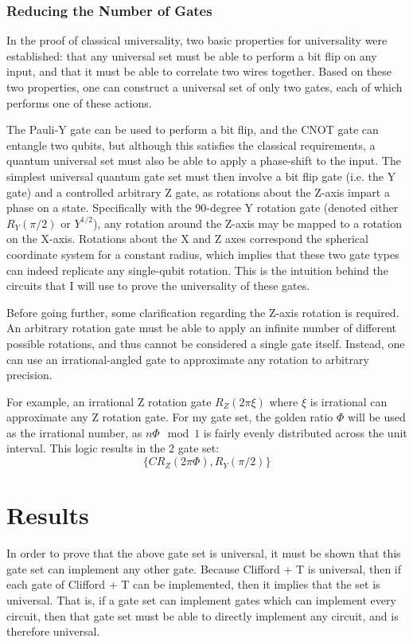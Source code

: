 \documentclass[12pt]{article}
\begin{document}
\subsubsection{Reducing the Number of Gates}
In the proof of classical universality, two basic properties for universality were established: that any universal set must be able to perform a bit flip on any input, and that it must be able to correlate two wires together. Based on these two properties, one can construct a universal set of only two gates, each of which performs one of these actions.

The Pauli-Y gate can be used to perform a bit flip, and the CNOT gate can entangle two qubits, but although this satisfies the classical requirements, a quantum universal set must also be able to apply a phase-shift to the input. The simplest universal quantum gate set must then involve a bit flip gate (i.e. the Y gate) and a controlled arbitrary Z gate, as rotations about the Z-axis impart a phase on a state. Specifically with the 90-degree Y rotation gate (denoted either $R_Y(\pi/2)$ or $Y^{1/2}$), any rotation around the Z-axis may be mapped to a rotation on the X-axis. Rotations about the X and Z axes correspond the spherical coordinate system for a constant radius, which implies that these two gate types can indeed replicate any single-qubit rotation. This is the intuition behind the circuits that I will use to prove the universality of these gates.

Before going further, some clarification regarding the Z-axis rotation is required. An arbitrary rotation gate must be able to apply an infinite number of different possible rotations, and thus cannot be considered a single gate itself. Instead, one can use an irrational-angled gate to approximate any rotation to arbitrary precision.

For example, an irrational Z rotation gate $R_Z(2\pi\xi)$ where $\xi$ is irrational can approximate any Z rotation gate. For my gate set, the golden ratio $\Phi$ will be used as the irrational number, as $n \Phi \mod 1$ is fairly evenly distributed across the unit interval.
This logic results in the 2 gate set:
$$\{CR_Z(2\pi\Phi), R_Y(\pi/2)\}$$

\section{Results}
In order to prove that the above gate set is universal, it must be shown that this gate set can implement any other gate. Because Clifford + T is universal, then if each gate of Clifford + T can be implemented, then it implies that the set is universal. That is, if a gate set can implement gates which can implement every circuit, then that gate set must be able to directly implement any circuit, and is therefore universal.
\end{document}
